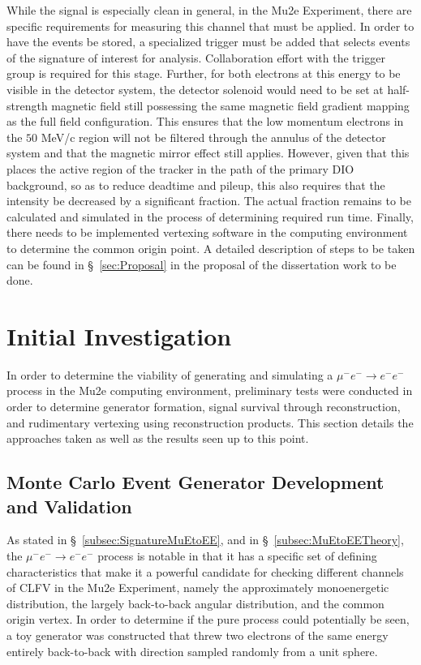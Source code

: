 \documentclass[12pt]{article}
\newcommand{\muEtoEE}{\mu^- e^- \to e^- e^-}
\begin{document}
While the signal is especially clean in general, in the Mu2e Experiment, there are specific requirements for measuring this channel that must be applied. In order to have the events be stored, a specialized trigger must be added that selects events of the signature of interest for analysis. Collaboration effort with the trigger group is required for this stage. Further, for both electrons at this energy to be visible in the detector system, the detector solenoid would need to be set at half-strength magnetic field still possessing the same magnetic field gradient mapping as the full field configuration. This ensures that the low momentum electrons in the $50$ MeV/c region will not be filtered through the annulus of the detector system and that the magnetic mirror effect still applies. However, given that this places the active region of the tracker in the path of the primary DIO background, so as to reduce deadtime and pileup, this also requires that the intensity be decreased by a significant fraction. The actual fraction remains to be calculated and simulated in the process of determining required run time. Finally, there needs to be implemented vertexing software in the computing environment to determine the common origin point. A detailed description of steps to be taken can be found in \S~\ref{sec:Proposal} in the proposal of the dissertation work to be done. 

\section{Initial Investigation} \label{sec:InitialInvestigation}

In order to determine the viability of generating and simulating a $\muEtoEE$ process in the Mu2e computing environment, preliminary tests were conducted in order to determine generator formation, signal survival through reconstruction, and rudimentary vertexing using reconstruction products. This section details the approaches taken as well as the results seen up to this point. 

\subsection{Monte Carlo Event Generator Development and Validation}\label{subsec:MCGenDevValid}

As stated in \S~\ref{subsec:SignatureMuEtoEE}, and in \S~\ref{subsec:MuEtoEETheory}, the $\muEtoEE$ process is notable in that it has a specific set of defining characteristics that make it a powerful candidate for checking different channels of CLFV in the Mu2e Experiment, namely the approximately monoenergetic distribution, the largely back-to-back angular distribution, and the common origin vertex. In order to determine if the pure process could potentially be seen, a toy generator was constructed that threw two electrons of the same energy entirely back-to-back with direction sampled randomly from a unit sphere. 
\end{document}
